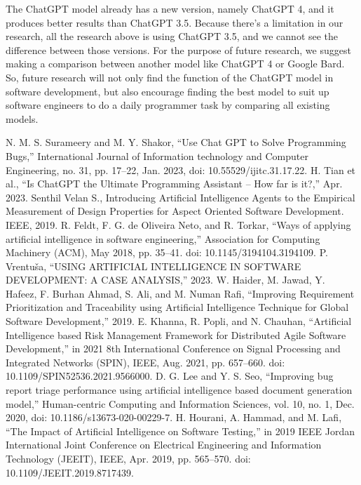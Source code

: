 \documentclass[conference]{IEEEtran}
\begin{document}
The ChatGPT model already has a new version, namely ChatGPT 4, and it produces better results than ChatGPT 3.5. Because there's a limitation in our research, all the research above is using ChatGPT 3.5, and we cannot see the difference between those versions. For the purpose of future research, we suggest making a comparison between another model like ChatGPT 4 or Google Bard. So, future research will not only find the function of the ChatGPT model in software development, but also encourage finding the best model to suit up software engineers to do a daily programmer task by comparing all existing models.

\begin{thebibliography}{00}
 N. M. S. Surameery and M. Y. Shakor, “Use Chat GPT to Solve Programming Bugs,” International Journal of Information technology and Computer Engineering, no. 31, pp. 17–22, Jan. 2023, doi: 10.55529/ijitc.31.17.22. 
 H. Tian et al., “Is ChatGPT the Ultimate Programming Assistant -- How far is it?,” Apr. 2023. 
 Senthil Velan S., Introducing Artificial Intelligence Agents to the Empirical Measurement of Design Properties for Aspect Oriented Software Development. IEEE, 2019. 
 R. Feldt, F. G. de Oliveira Neto, and R. Torkar, “Ways of applying artificial intelligence in software engineering,” Association for Computing Machinery (ACM), May 2018, pp. 35–41. doi: 10.1145/3194104.3194109. 
 P. Vrentuša, “USING ARTIFICIAL INTELLIGENCE IN SOFTWARE DEVELOPMENT: A CASE ANALYSIS,” 2023. 
 W. Haider, M. Jawad, Y. Hafeez, F. Burhan Ahmad, S. Ali, and M. Numan Rafi, “Improving Requirement Prioritization and Traceability using Artificial Intelligence Technique for Global Software Development,” 2019. 
 E. Khanna, R. Popli, and N. Chauhan, “Artificial Intelligence based Risk Management Framework for Distributed Agile Software Development,” in 2021 8th International Conference on Signal Processing and Integrated Networks (SPIN), IEEE, Aug. 2021, pp. 657–660. doi: 10.1109/SPIN52536.2021.9566000. 
 D. G. Lee and Y. S. Seo, “Improving bug report triage performance using artificial intelligence based document generation model,” Human-centric Computing and Information Sciences, vol. 10, no. 1, Dec. 2020, doi: 10.1186/s13673-020-00229-7. 
 H. Hourani, A. Hammad, and M. Lafi, “The Impact of Artificial Intelligence on Software Testing,” in 2019 IEEE Jordan International Joint Conference on Electrical Engineering and Information Technology (JEEIT), IEEE, Apr. 2019, pp. 565–570. doi: 10.1109/JEEIT.2019.8717439. 

\end{thebibliography}
\end{document}

